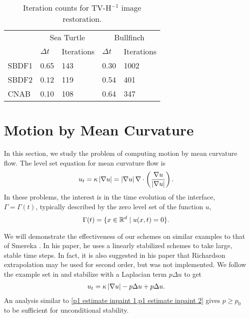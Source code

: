 \begin{table}[htb!]
\caption[Iteration counts for TV-H$^{-1}$ image restoration.]{Iteration counts for TV-H$^{-1}$ image restoration.}
        \centering\begin{tabular}{lll ll} \toprule[1.25pt]
& \multicolumn{2}{c}{Sea Turtle} & \multicolumn{2}{c}{Bullfinch}
\\
& $\Delta t$ & Iterations & $\Delta t$ & Iterations
\\ \midrule
SBDF1 & 0.65 & 143 & 0.30 & 1002
\\
SBDF2& 0.12 & 119 & 0.54 & 401 
\\             
CNAB & 0.10 & 108 & 0.64 & 347
\\ \bottomrule[1.25pt]
\end{tabular}
\label{tab:bvhneg iter counts}
\end{table}


\section{Motion by Mean Curvature}
In this section, we study the problem of computing motion by mean curvature flow. The level set equation for mean curvature flow is 
\begin{align}
        u_t 
= \kappa\left|\nabla u\right| 
= \left|\nabla u\right| \nabla \cdot \left(\frac{\nabla u}{\left|\nabla u\right|} \right).
\end{align}
In these problems, the interest is in the time evolution of the interface, $\Gamma=\Gamma(t)$, typically described by the zero level set of the function $u$,
\begin{align}
        \Gamma(t) = \{x \in \mathbb{R}^d \mid u(x,t) =0\}.
\end{align}

We will demonstrate the effectiveness of our schemes on similar examples to that of Smereka \cite{smereka2003semi}. In his paper, he uses a linearly stabilized schemes to take large, stable time steps. In fact, it is also suggested in his paper that Richardson extrapolation may be used for second order, but was not implemented. We follow the example set in \cite{smereka2003semi} and stabilize with a Laplacian term $p\Delta u$ to get 
\begin{align}
        u_t = \kappa \left|\nabla u\right| - p\Delta u + p\Delta u.
\end{align}
An analysis similar to \cref{p1 estimate inpaint 1,p1 estimate inpaint 2} gives $p\geq p_0$ to be sufficient for unconditional stability.

